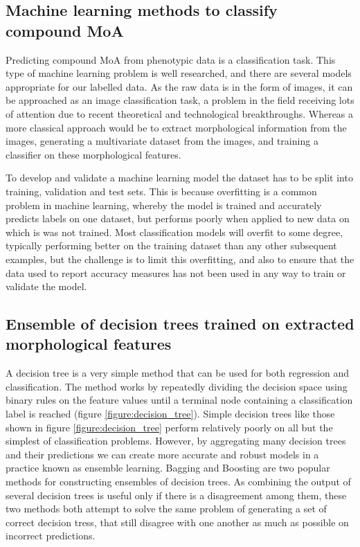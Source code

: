 \documentclass[a4paper,11pt,twoside,openright]{scrbook}
\begin{document}
\subsection{Machine learning methods to classify compound MoA}
Predicting compound MoA from phenotypic data is a classification task.
This type of machine learning problem is well researched, and there are several models appropriate for our labelled data.
As the raw data is in the form of images, it can be approached as an image classification task, a problem in the field receiving lots of attention due to recent theoretical and technological breakthroughs. %
Whereas a more classical approach would be to extract morphological information from the images, generating a multivariate dataset from the images, and training a classifier on these morphological features.

To develop and validate a machine learning model the dataset has to be split into training, validation and test sets.
This is because overfitting is a common problem in machine learning, whereby the model is trained and accurately predicts labels on one dataset, but performs poorly when applied to new data on which is was not trained.
Most classification models will overfit to some degree, typically performing better on the training dataset than any other subsequent examples, but the challenge is to limit this overfitting, and also to ensure that the data used to report accuracy measures has not been used in any way to train or validate the model.




\subsection{Ensemble of decision trees trained on extracted morphological features}
A decision tree is a very simple method that can be used for both regression and classification.
The method works by repeatedly dividing the decision space using binary rules on the feature values until a terminal node containing a classification label is reached (figure \ref{figure:decision_tree}).
Simple decision trees like those shown in figure \ref{figure:decision_tree} perform relatively poorly on all but the simplest of classification problems.
However, by aggregating many decision trees and their predictions we can create more accurate and robust models in a practice known as ensemble learning. \cite{Opitz1999}
Bagging \cite{Breiman1996} and Boosting \cite{Freund1996} are two popular methods for constructing ensembles of decision trees.
As combining the output of several decision trees is useful only if there is a disagreement among them, these two methods both attempt to solve the same problem of generating a set of correct decision tress, that still disagree with one another as much as possible on incorrect predictions.
\end{document}
